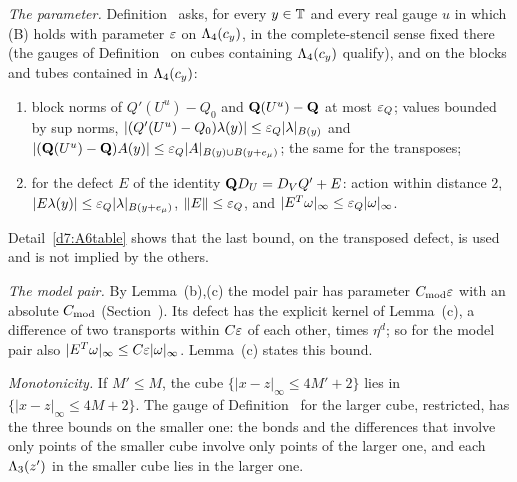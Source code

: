 \begin{detail}\label{d7:defpar}
\begin{step}
\emph{The parameter.} Definition~ asks, for every $y\in\mathbb T$ and every real gauge $u$ in which (B) holds with parameter $\varepsilon$ on $\Lambda_4(c_y)$, in the complete-stencil sense fixed there (the gauges of Definition~ on cubes containing $\Lambda_4(c_y)$ qualify), and on the blocks and tubes contained in $\Lambda_4(c_y)$:
\begin{enumerate}[label=(\alph*)]
\item block norms of $Q'(U^u)-Q_0$ and $\mathbf Q(U^u)-\mathbf Q$ at most $\varepsilon_Q$; values bounded by sup norms, $|(Q'(U^u)-Q_0)\lambda(y)|\le\varepsilon_Q|\lambda|_{B(y)}$ and $|(\mathbf Q(U^u)-\mathbf Q)A(y)|\le\varepsilon_Q|A|_{B(y)\cup B(y+e_\mu)}$; the same for the transposes;
\item for the defect $E$ of the identity $\mathbf Q D_U=D_VQ'+E$: action within distance $2$, $|E\lambda(y)|\le\varepsilon_Q|\lambda|_{B(y+e_\mu)}$, $\|E\|\le\varepsilon_Q$, and $|E^T\omega|_\infty\le\varepsilon_Q|\omega|_\infty$.
\end{enumerate}
Detail~\ref{d7:A6table} shows that the last bound, on the transposed defect, is used and is not implied by the others.
\end{step}
\begin{step}
\emph{The model pair.} By Lemma~(b),(c) the model pair has parameter $C_{\rm mod}\varepsilon$ with an absolute $C_{\rm mod}$ (Section~). Its defect has the explicit kernel of Lemma~(c), a difference of two transports within $C\varepsilon$ of each other, times $\eta^d$; so for the model pair also $|E^T\omega|_\infty\le C\varepsilon|\omega|_\infty$. Lemma~(c) states this bound.
\end{step}
\begin{step}
\emph{Monotonicity.} If $M'\le M$, the cube $\{|x-z|_\infty\le4M'+2\}$ lies in $\{|x-z|_\infty\le4M+2\}$. The gauge of Definition~ for the larger cube, restricted, has the three bounds on the smaller one: the bonds and the differences that involve only points of the smaller cube involve only points of the larger one, and each $\Lambda_3(z')$ in the smaller cube lies in the larger one.
\end{step}
\end{detail}

